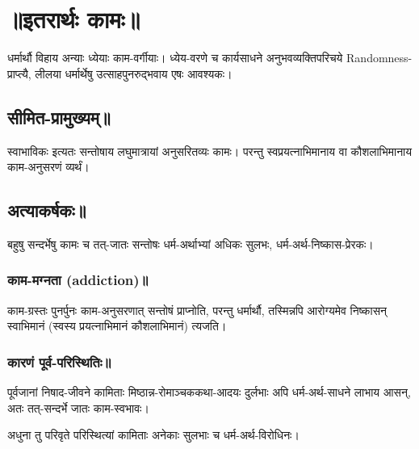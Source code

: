 \documentclass[oneside, article]{memoir}
\begin{document}
\chapter{॥इतरार्थः कामः॥}
धर्मार्थौ विहाय अन्याः ध्येयाः काम-वर्गीयाः। ध्येय-वरणे च कार्यसाधने अनुभवव्यक्तिपरिचये Randomness-प्राप्त्यै, लीलया धर्मार्थेषु उत्साहपुनरुद्भवाय एषः आवश्यकः।

\section{सीमित-प्रामुख्यम्॥}
स्वाभाविकः इत्यतः सन्तोषाय लघुमात्रायां अनुसरितव्यः कामः। परन्तु स्वप्रयत्नाभिमानाय वा कौशलाभिमानाय काम-अनुसरणं व्यर्थं।

\section{अत्याकर्षकः॥}
बहुषु सन्दर्भेषु कामः च तत्-जातः सन्तोषः धर्म-अर्थाभ्यां अधिकः सुलभः, धर्म-अर्थ-निष्कास-प्रेरकः।

\subsection{काम-मग्नता (addiction)॥}
काम-ग्रस्तः पुनर्पुनः काम-अनुसरणात् सन्तोषं प्राप्नोति, परन्तु धर्मार्थौ, तस्मिन्नपि आरोग्यमेव निष्कासन् स्वाभिमानं (स्वस्य प्रयत्नाभिमानं कौशलाभिमानं) त्यजति।

\subsection{कारणं पूर्व-परिस्थितिः॥}
पूर्वजानां निषाद-जीवने कामिताः मिष्ठान्न-रोमाञ्चककथा-आदयः दुर्लभाः अपि धर्म-अर्थ-साधने लाभाय आसन्, अतः तत्-सन्दर्भे जातः काम-स्वभावः।

अधुना तु परिवृते परिस्थित्यां कामिताः अनेकाः सुलभाः च धर्म-अर्थ-विरोधिनः।
\end{document}
